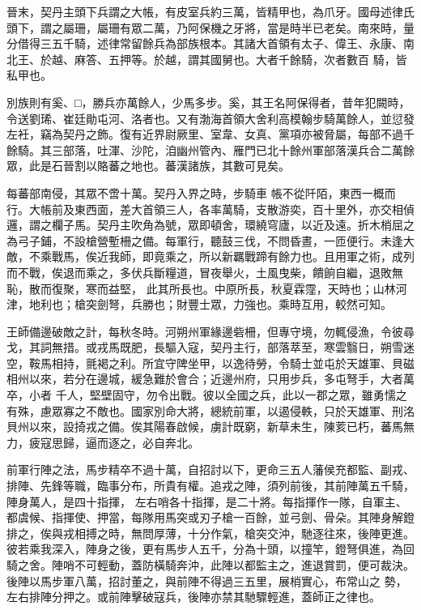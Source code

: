 \begin{pinyinscope}
 晉末，契丹主頭下兵謂之大帳，有皮室兵約三萬，皆精甲也，為爪牙。國母述律氏頭下，謂之屬珊，屬珊有眾二萬，乃阿保機之牙將，當是時半已老矣。南來時，量分借得三五千騎，述律常留餘兵為部族根本。其諸大首領有太子、偉王、永康、南北王、於越、麻答、五押等。於越，謂其國舅也。大者千餘騎，次者數百
 騎，皆私甲也。



 別族則有奚、□，勝兵亦萬餘人，少馬多步。奚，其王名阿保得者，昔年犯闕時，令送劉琋、崔廷勛屯河、洛者也。又有渤海首領大舍利高模翰步騎萬餘人，並愆發左衽，竊為契丹之飾。復有近界尉厥里、室韋、女真、黨項亦被脅屬，每部不過千餘騎。其三部落，吐渾、沙陀，洎幽州管內、雁門已北十餘州軍部落漢兵合二萬餘眾，此是石晉割以賂蕃之地也。蕃漢諸族，其數可見矣。



 每蕃部南侵，其眾不啻十萬。契丹入界之時，步騎車
 帳不從阡陌，東西一概而行。大帳前及東西面，差大首領三人，各率萬騎，支散游奕，百十里外，亦交相偵邏，謂之欄子馬。契丹主吹角為號，眾即頓舍，環繞穹廬，以近及遠。折木梢屈之為弓子鋪，不設槍營塹柵之備。每軍行，聽鼓三伐，不問昏晝，一匝便行。未逢大敵，不乘戰馬，俟近我師，即竟乘之，所以新羈戰蹄有餘力也。且用軍之術，成列而不戰，俟退而乘之，多伏兵斷糧道，冒夜舉火，土風曳柴，饋餉自繼，退敗無恥，散而復聚，寒而益堅，
 此其所長也。中原所長，秋夏霖霪，天時也；山林河津，地利也；槍突劍弩，兵勝也；財豐士眾，力強也。乘時互用，較然可知。



 王師備邊破敵之計，每秋冬時。河朔州軍緣邊砦柵，但專守境，勿輒侵漁，令彼尋戈，其詞無措。或戎馬既肥，長驅入寇，契丹主行，部落萃至，寒雲翳日，朔雪迷空，鞍馬相持，氈褐之利。所宜守陴坐甲，以逸待勞，令騎士並屯於天雄軍、貝磁相州以來，若分在邊城，緩急難於會合；近邊州府，只用步兵，多屯弩手，大者萬卒，小者
 千人，堅壁固守，勿令出戰。彼以全國之兵，此以一郡之眾，雖勇懦之有殊，慮眾寡之不敵也。國家別命大將，總統前軍，以遏侵軼，只於天雄軍、刑洺貝州以來，設掎戎之備。俟其陽春啟候，虜計既窮，新草未生，陳荄已朽，蕃馬無力，疲寇思歸，逼而逐之，必自奔北。



 前軍行陣之法，馬步精卒不過十萬，自招討以下，更命三五人藩侯充都監、副戎、排陣、先鋒等職，臨事分布，所貴有權。追戎之陣，須列前後，其前陣萬五千騎，陣身萬人，是四十指揮，
 左右哨各十指揮，是二十將。每指揮作一隊，自軍主、都虞候、指揮使、押當，每隊用馬突或刃子槍一百餘，並弓劍、骨朵。其陣身解鐙排之，俟與戎相搏之時，無問厚薄，十分作氣，槍突交沖，馳逐往來，後陣更進。彼若乘我深入，陣身之後，更有馬步人五千，分為十頭，以撞竿，鐙弩俱進，為回騎之舍。陣哨不可輕動，蓋防橫騎奔沖，此陣以都監主之，進退賞罰，便可裁決。後陣以馬步軍八萬，招討董之，與前陣不得過三五里，展梢實心，布常山之
 勢，左右排陣分押之。或前陣擊破寇兵，後陣亦禁其馳驟輕進，蓋師正之律也。




\end{pinyinscope}

